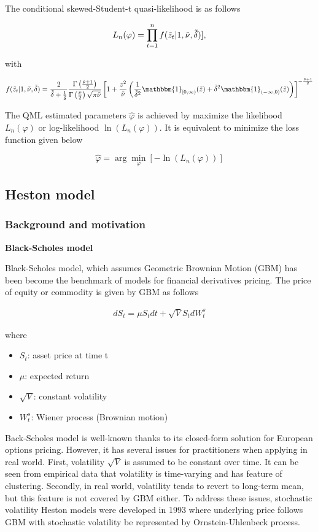 \documentclass[12pt,a4paper]{article}
\numberwithin{equation}{section}
\begin{document}
The conditional skewed-Student-t quasi-likelihood is as follows

\[L_n(\varphi) = \prod_{t=1}^{n} f(\Tilde{z}_t|1, \Tilde{\nu}, \Tilde{\delta})], \]

with

\[f(\Tilde{z}_t|1, \Tilde{\nu}, \Tilde{\delta}) = \frac{2}{\Tilde{\delta}+ \frac{1}{\Tilde{\delta}}} \frac{\Gamma\left(\frac{\Tilde{\nu} + 1}{2}\right)}{\Gamma\left(\frac{\Tilde{\nu}}{2}\right) \sqrt{\pi \Tilde{\nu}}}
\left[ 1 + \frac{z^2}{\Tilde{\nu}} \left( \frac{1}{\Tilde{\delta}^2} \mathbbm{1}_{[0, \infty)} (\Tilde{z}) + \Tilde{\delta}^2 \mathbbm{1}_{(-\infty, 0)} (\Tilde{z}) \right) \right]^{-\frac{\Tilde{\nu} + 1}{2}}
\]

The QML estimated parameters $\hat{\varphi}$ is achieved by maximize the likelihood $L_n(\varphi)$ or log-likelihood $\ln(L_n(\varphi))$. It is equivalent to minimize the loss function given below

\[\hat{\varphi} = \arg\min_\varphi \left [ - \ln(L_n(\varphi)) \right] \]


\subsection{Heston model}
\subsubsection{Background and motivation}

\textbf{Black-Scholes model}

Black-Scholes model, which assumes Geometric Brownian Motion (GBM) has been become the benchmark of models for financial derivatives pricing. The price of equity or commodity is given by GBM as follows

\begin{align*}
dS_t = \mu S_t dt + \sqrt{V} S_t dW_t^s
\end{align*}

where 

\begin{itemize}
\item $S_t$: asset price at time t
\item $\mu$: expected return
\item $\sqrt{V}$: constant volatility
\item $W_t^s$: Wiener process (Brownian motion)
\end{itemize}

Back-Scholes model is well-known thanks to its closed-form solution for European options pricing. However, it has several issues for practitioners when applying in real world. First, volatility $\sqrt{V}$ is assumed to be constant over time. It can be seen from empirical data that volatility is time-varying and has feature of clustering. Secondly, in real world, volatility tends to revert to long-term mean, but this feature is not covered by GBM either. To address these issues, stochastic volatility Heston models were developed in 1993 where underlying price follows GBM with stochastic volatility be represented by Ornstein-Uhlenbeck process.
\end{document}
